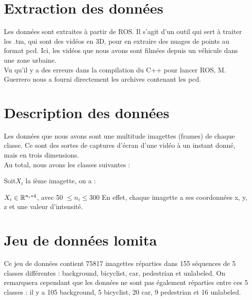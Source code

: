 \section{Extraction des données}

	Les données sont extraites à partir de ROS. Il s'agit d'un outil qui sert à traiter les .tm, qui sont des vidéos en 3D, pour en extraire des nuages de points au format pcd. Ici, les vidéos que nous avons sont filmées depuis un véhicule dans une zone urbaine.\\

	Vu qu’il y a des erreurs dans la compilation du C++ pour lancer ROS, M. Guerrero nous a fourni directement les archives contenant les pcd.\\

\section{Description des données}

	Les données que nous avons sont une multitude imagettes (frames) de chaque classe. Ce sont des sortes de captures d'écran d'une vidéo à un instant donné, mais en trois dimensions.\\

	Au total, nous avons les classes suivantes : 

	Soit$ X_{i}$ la ième imagette, on a :

	$  X_{i} \in \mathbb{R}^{n_{i}*4} $, avec 50 $\leq n_{i} \leq 300$
	En effet, chaque imagette a ses coordonnées x, y, z et une valeur d'intensité. \\ 

\section{Jeu de données lomita}

	Ce jeu de données contient 75817 imagettes réparties dans 155 séquences de 5 classes différentes : background, bicyclist, car, pedestrian et unlabeled. On remarquera cependant que les données ne sont pas également réparties entre ces 5 classes : il y a 105 background, 5 bicyclist, 20 car, 9 pedestrian et 16 unlabeled.